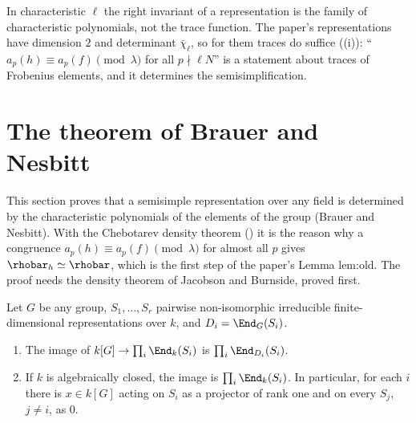 \begin{warning}
In characteristic $\ell$ the right invariant of a representation is the family of characteristic polynomials, not the trace function.
The paper's representations have dimension $2$ and determinant $\bar\chi_\ell$, so for them traces do suffice
((i)): ``$a_p(h)\equiv a_p(f)\pmod\lambda$ for all $p\nmid\ell N$'' is a statement about traces of Frobenius
elements, and it determines the semisimplification.
\end{warning}

\section{The theorem of Brauer and Nesbitt}\label{sec:reps:brauer-nesbitt}

This section proves that a semisimple representation over any field is determined by the characteristic polynomials of the
elements of the group (Brauer and Nesbitt). With the Chebotarev density theorem () it is the reason why a congruence
$a_p(h)\equiv a_p(f)\pmod\lambda$ for almost all $p$ gives $\rhobar_h\simeq\rhobar$, which is the first step of the paper's Lemma lem:old. The proof needs the
density theorem of Jacobson and Burnside, proved first.

\begin{theorem}\label{thm:reps:burnside}
Let $G$ be any group, $S_1,\dots,S_r$ pairwise non-isomorphic irreducible finite-dimensional representations over $k$, and
$D_i=\End_G(S_i)$.
\begin{enumerate}[label=(\alph*)]
\item The image of $k[G]\to\prod_i\End_k(S_i)$ is $\prod_i\End_{D_i}(S_i)$.
\item If $k$ is algebraically closed, the image is $\prod_i\End_k(S_i)$. In particular, for each $i$ there is $x\in k[G]$ acting on $S_i$ as a
projector of rank one and on every $S_j$, $j\ne i$, as $0$.
\end{enumerate}
\end{theorem}

